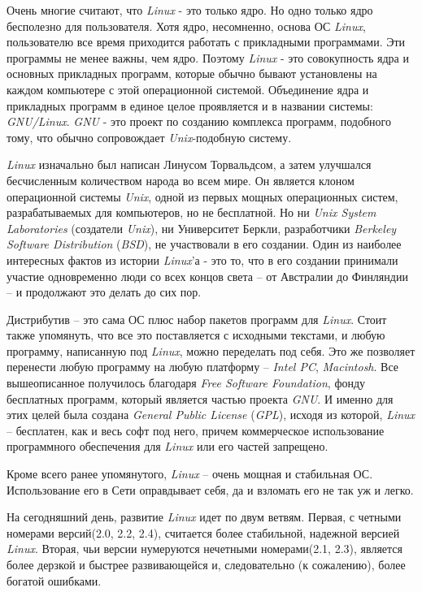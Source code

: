 Очень многие считают, что \textit{Linux} - это только ядро. Но одно только ядро бесполезно для пользователя. Хотя ядро, несомненно, основа ОС \textit{Linux}, пользователю все время приходится работать с прикладными программами. Эти программы не менее важны, чем ядро. Поэтому \textit{Linux} - это совокупность ядра и основных прикладных программ, которые обычно бывают установлены на каждом компьютере с этой операционной системой. Объединение ядра и прикладных программ в единое целое проявляется и в названии системы: \textit{GNU/Linux}. \textit{GNU} - это проект по созданию комплекса программ, подобного тому, что обычно сопровождает \textit{Unix}-подобную систему.

\textit{Linux} изначально был написан Линусом Торвальдсом, а затем улучшался бесчисленным количеством народа во всем мире. Он является клоном операционной системы \textit{Unix}, одной из первых мощных операционных систем, разрабатываемых для компьютеров, но не бесплатной. Но ни \textit{Unix System Laboratories} (создатели \textit{Unix}), ни Университет Беркли, разработчики \textit{Berkeley Software Distribution} (\textit{BSD}), не участвовали в его создании. Один из наиболее интересных фактов из истории \textit{Linux}'а - это то, что в его создании принимали участие одновременно люди со всех концов света – от Австралии до Финляндии – и продолжают это делать до сих пор.

Дистрибутив – это сама ОС плюс набор пакетов программ для \textit{Linux}. Стоит также упомянуть, что все это поставляется с исходными текстами, и любую программу, написанную под \textit{Linux}, можно переделать под себя. Это же позволяет перенести любую программу на любую платформу –\textit{ Intel PC}, \textit{Macintosh}. Все вышеописанное получилось благодаря \textit{Free Software Foundation}, фонду бесплатных программ, который является частью проекта \textit{GNU}. И именно для этих целей была создана \textit{General Public License} (\textit{GPL}), исходя из которой, \textit{Linux} – бесплатен, как и весь софт под него, причем коммерческое использование программного обеспечения для \textit{Linux} или его частей запрещено.

Кроме всего ранее упомянутого, \textit{Linux} – очень мощная и стабильная ОС. Использование его в Сети оправдывает себя, да и взломать его не так уж и легко.

На сегодняшний день, развитие \textit{Linux} идет по двум ветвям. Первая, с четными номерами версий(2.0, 2.2, 2.4), считается более стабильной, надежной версией \textit{Linux}. Вторая, чьи версии нумеруются нечетными номерами(2.1, 2.3), является более дерзкой и быстрее развивающейся и, следовательно (к сожалению), более богатой ошибками.

